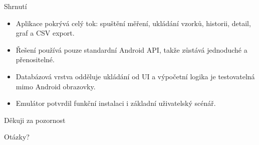 \documentclass[aspectratio=169]{beamer}
\begin{document}
\begin{frame}{Shrnutí}
  \begin{itemize}
    \item Aplikace pokrývá celý tok: spuštění měření, ukládání vzorků, historii, detail, graf a CSV export.
    \item Řešení používá pouze standardní Android API, takže zůstává jednoduché a přenositelné.
    \item Databázová vrstva odděluje ukládání od UI a výpočetní logika je testovatelná mimo Android obrazovky.
    \item Emulátor potvrdil funkční instalaci i základní uživatelský scénář.
  \end{itemize}
\end{frame}

\begin{frame}
  \centering
  \vspace{1.2cm}
  {\color{TrackerGreen}\Huge Děkuji za pozornost}

  \vspace{0.8cm}
  {\Large Otázky?}
\end{frame}
\end{document}
